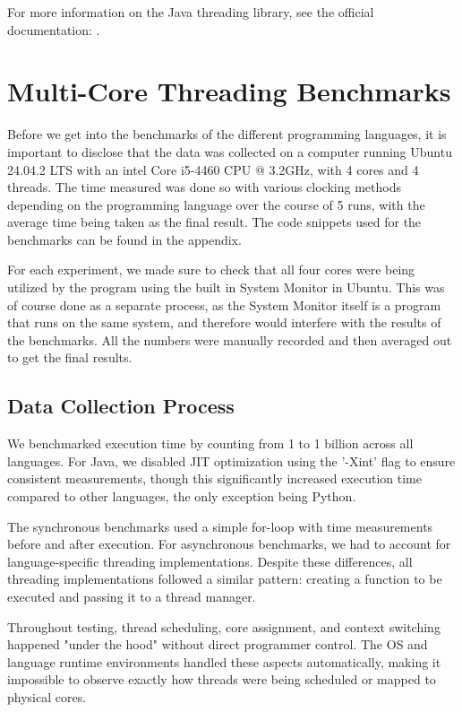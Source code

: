 \documentclass[12pt,a4paper]{article}
\begin{document}
For more information on the Java threading library, see the official documentation: .

\section{Multi-Core Threading Benchmarks}

Before we get into the benchmarks of the different programming languages, it is important to disclose that the data was collected on a computer running Ubuntu 24.04.2 LTS with an intel Core i5-4460 CPU @ 3.2GHz, with 4 cores and 4 threads. The time measured was done so with various clocking methods depending on the programming language over the course of 5 runs, with the average time being taken as the final result. The code snippets used for the benchmarks can be found in the appendix.

For each experiment, we made sure to check that all four cores were being utilized by the program using the built in System Monitor in Ubuntu. This was of course done as a separate process, as the System Monitor itself is a program that runs on the same system, and therefore would interfere with the results of the benchmarks. All the numbers were manually recorded and then averaged out to get the final results. 

\subsection{Data Collection Process}

We benchmarked execution time by counting from 1 to 1 billion across all languages. For Java, we disabled JIT optimization using the '-Xint' flag to ensure consistent measurements, though this significantly increased execution time compared to other languages, the only exception being Python.

The synchronous benchmarks used a simple for-loop with time measurements before and after execution. For asynchronous benchmarks, we had to account for language-specific threading implementations. Despite these differences, all threading implementations followed a similar pattern: creating a function to be executed and passing it to a thread manager.

Throughout testing, thread scheduling, core assignment, and context switching happened "under the hood" without direct programmer control. The OS and language runtime environments handled these aspects automatically, making it impossible to observe exactly how threads were being scheduled or mapped to physical cores.
\end{document}
